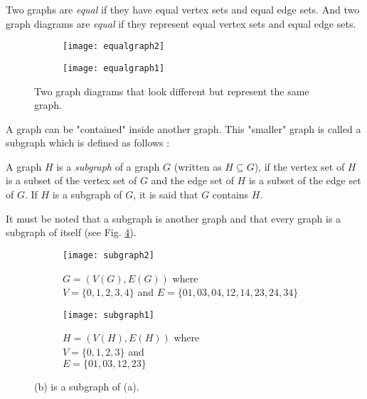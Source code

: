 \begin{defn}
	\label{equality}
	Two graphs are \textit{equal} if they have equal vertex sets and equal edge sets. And two graph diagrams are \textit{equal} if they represent equal vertex sets and equal edge sets.\\
\end{defn}

\begin{figure}[h]
	\centering
	\begin{subfigure}[b]{0.4\textwidth}
		\centering
		\texttt{[image: equalgraph2]}
	\end{subfigure}
	\hfill
	\begin{subfigure}[b]{0.3\textwidth}
		\centering
		\texttt{[image: equalgraph1]}
	\end{subfigure}
	\caption{Two graph diagrams that look different but represent the same graph.}
	\label{fig:equal}
\end{figure}

A graph can be "contained" inside another graph. This "smaller" graph is called a subgraph which is defined as follows \cite{trudeau}:\\

\begin{defn}
	A graph $H$ is a \textit{subgraph} of a graph $G$ (written as $H\subseteq G$), if the vertex set of $H$ is a subset of the vertex set of $G$ and the edge set of $H$ is a subset of the edge set of $G$. If $H$ is a subgraph of $G$, it is said that $G$ contains $H$.\\
\end{defn}

It must be noted that a subgraph is another graph and that every graph is a subgraph of itself \cite{wilsonwatkins} (see Fig. \ref{fig:subgraphs}).

\begin{figure}[h]
	\centering
	\begin{subfigure}[b]{0.4\textwidth}
		\centering
		\texttt{[image: subgraph2]}
		\caption{$G=(V(G),E(G))$ where\\   $V=\{0,1,2,3,4\}$ and $E=\{01,03,04,12,14,23,24,34\}$}
		\label{fig:subgraph2}
	\end{subfigure}
	\hfill
	\begin{subfigure}[b]{0.4\textwidth}
		\centering
		\texttt{[image: subgraph1]}
		\caption{$H=(V(H),E(H))$ where\\   $V=\{0,1,2,3\}$ and\\$E=\{01,03,12,23\}$}
		\label{fig:subgraph1}
	\end{subfigure}
	\caption[A subgraph.]{(b) is a subgraph of (a).}
	\label{fig:subgraphs}
\end{figure}

